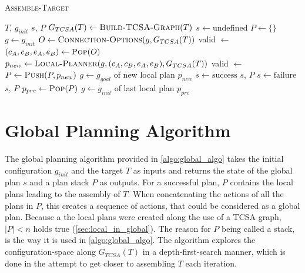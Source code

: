 \begin{algorithm}
	\caption{\scshape Assemble-Target}
	\label{algo:global_algo}
	\begin{algorithmic}[1]
		\REQUIRE $T$, $g_{init}$
		\ENSURE $s$, $P$ 
		\STATE $G_{TCSA}(T) \gets \text{\scshape Build-TCSA-Graph}(T)$
		\STATE $s \gets \text{undefined}$
		\STATE $P \gets \{\}$ 
		\STATE $g \gets g_{init}$ 
		\LOOP
			\STATE $O \gets \text{\scshape Connection-Options}(g, G_{TCSA}(T))$
			\STATE valid $\gets$ \FALSE
				\STATE $(c_A, c_B, e_A, e_B) \gets \text{\scshape Pop}(O)$
				\STATE $p_{new} \gets \text{\scshape Local-Planner}(g, (c_A, c_B, e_A, e_B), G_{TCSA}(T))$
					\STATE valid $\gets$ \TRUE
				\ENDIF
			\ENDWHILE
				\STATE $P \gets \text{\scshape Push}(P, p_{new})$ 
				\STATE $g \gets g_{goal}$ of new local plan $p_{new}$ 
					\STATE $s \gets \text{success}$
					\RETURN $s$, $P$
				\ENDIF
			\ELSE
					\STATE $s \gets \text{failure}$
					\RETURN $s$, $P$
				\ENDIF
				\STATE $p_{pre} \gets \text{\scshape Pop}(P)$ 
				\STATE $g \gets g_{init}$ of last local plan $p_{pre}$ 
			\ENDIF
		\ENDLOOP
	\end{algorithmic}
\end{algorithm}


\section{Global Planning Algorithm}
\label{sec:global_algo}

The global planning algorithm provided in \autoref{algo:global_algo} takes the initial configuration $g_{init}$ and the target $T$ as inputs and returns the state of the global plan $s$ and a plan stack $P$ as outputs.
For a successful plan, $P$ contains the local plans leading to the assembly of $T$.
When concatenating the actions of all the plans in $P$, this creates a sequence of actions, that could be considered as a global plan.
Because a the local plans were created along the use of a TCSA graph, $|P| < n$ holds true (\autoref{sec:local_in_global}).
The reason for $P$ being called a stack, is the way it is used in \autoref{algo:global_algo}.
The algorithm explores the configuration-space along $G_{TCSA}(T)$ in a depth-first-search manner, which is done in the attempt to get closer to assembling $T$ each iteration.

